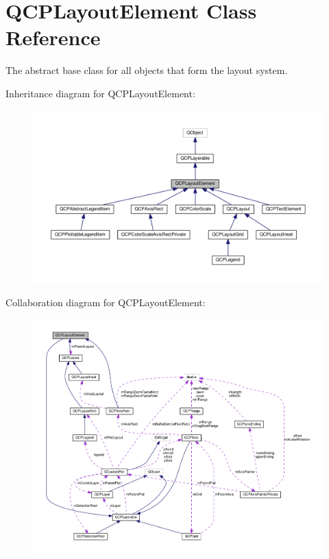 \hypertarget{classQCPLayoutElement}{}\section{Q\+C\+P\+Layout\+Element Class Reference}
\label{classQCPLayoutElement}


The abstract base class for all objects that form the layout system.  




Inheritance diagram for Q\+C\+P\+Layout\+Element\+:
\nopagebreak
\begin{figure}[H]
\begin{center}
\leavevmode
\includegraphics[width=350pt]{classQCPLayoutElement__inherit__graph}
\end{center}
\end{figure}


Collaboration diagram for Q\+C\+P\+Layout\+Element\+:
\nopagebreak
\begin{figure}[H]
\begin{center}
\leavevmode
\includegraphics[width=350pt]{classQCPLayoutElement__coll__graph}
\end{center}
\end{figure}
